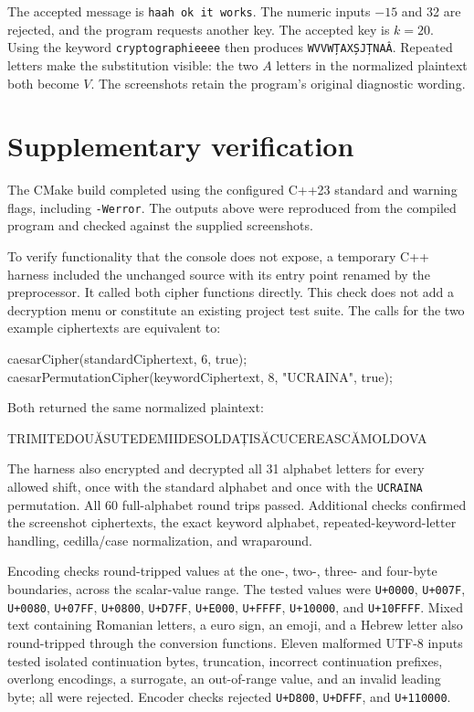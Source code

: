 \documentclass{utmreport}
\begin{document}
The accepted message is \texttt{haah ok it works}. The numeric inputs $-15$ and 32 are rejected, and the program requests another key. The accepted key is $k=20$. Using the keyword \texttt{cryptographieeee} then produces \texttt{WVVWȚAXȘJȚNAÂ}. Repeated letters make the substitution visible: the two $A$ letters in the normalized plaintext both become $V$. The screenshots retain the program's original diagnostic wording.

\section{Supplementary verification}
The CMake build completed using the configured C++23 standard and warning flags, including \texttt{-Werror}. The outputs above were reproduced from the compiled program and checked against the supplied screenshots.

To verify functionality that the console does not expose, a temporary C++ harness included the unchanged source with its entry point renamed by the preprocessor. It called both cipher functions directly. This check does not add a decryption menu or constitute an existing project test suite. The calls for the two example ciphertexts are equivalent to:
\begin{cppcode}
caesarCipher(standardCiphertext, 6, true);
caesarPermutationCipher(keywordCiphertext, 8, "UCRAINA", true);
\end{cppcode}
Both returned the same normalized plaintext:
\begin{console}
TRIMITEDOUĂSUTEDEMIIDESOLDAȚISĂCUCEREASCĂMOLDOVA
\end{console}
The harness also encrypted and decrypted all 31 alphabet letters for every allowed shift, once with the standard alphabet and once with the \texttt{UCRAINA} permutation. All 60 full-alphabet round trips passed. Additional checks confirmed the screenshot ciphertexts, the exact keyword alphabet, repeated-keyword-letter handling, cedilla/case normalization, and wraparound.

Encoding checks round-tripped values at the one-, two-, three- and four-byte boundaries, across the scalar-value range. The tested values were \texttt{U+0000}, \texttt{U+007F}, \texttt{U+0080}, \texttt{U+07FF}, \texttt{U+0800}, \texttt{U+D7FF}, \texttt{U+E000}, \texttt{U+FFFF}, \texttt{U+10000}, and \texttt{U+10FFFF}. Mixed text containing Romanian letters, a euro sign, an emoji, and a Hebrew letter also round-tripped through the conversion functions. Eleven malformed UTF-8 inputs tested isolated continuation bytes, truncation, incorrect continuation prefixes, overlong encodings, a surrogate, an out-of-range value, and an invalid leading byte; all were rejected. Encoder checks rejected \texttt{U+D800}, \texttt{U+DFFF}, and \texttt{U+110000}.
\end{document}
